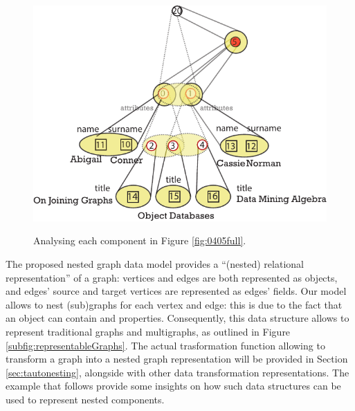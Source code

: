 \begin{figure}
\begin{minipage}{.5\textwidth}
	\label{fig:0403Expressions}
\end{minipage} 
\medskip
\centering
\begin{minipage}{.8\textwidth}
	\centering
	\includegraphics{fig/04model/0404Attributes_1}
	\label{fig:0404Attributes}
\end{minipage}\quad 
	\caption{Analysing each component in Figure \vref{fig:0405full}. }
	\label{fig:nestingexample}
\end{figure}
The proposed nested graph data model provides a ``(nested) relational representation'' of a graph: vertices and edges are both represented as objects, and edges' source and target vertices are represented as edges' fields. Our model allows to nest (sub)graphs for each vertex and edge: this is due to the fact that an object can contain  and  properties. Consequently, this data structure allows to represent traditional graphs and multigraphs, as outlined in Figure \vref{subfig:representableGraphs}. The actual trasformation function allowing to transform a graph into a nested graph representation will be provided in Section \vref{sec:tautonesting}, alongside with other data transformation representations.
The example that follows provide some insights on how such data structures can be used to represent nested components.

